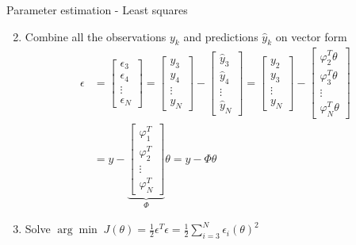 \documentclass[presentation,aspectratio=169]{beamer}
\begin{document}
\begin{frame}[label={sec:orgd1a0844}]{Parameter estimation - Least squares}
\begin{enumerate}
\setcounter{enumi}{1}
\item Combine all the observations \(y_k\) and predictions \(\hat{y}_k\) on vector form
\begin{align*}
\epsilon &= \begin{bmatrix} \epsilon_3\\\epsilon_4\\\vdots\\\epsilon_N\end{bmatrix} =  \begin{bmatrix} y_3\\ y_4\\\vdots\\y_N \end{bmatrix} - \begin{bmatrix} \hat{y}_3\\ \hat{y}_4\\\vdots\\\hat{y}_N \end{bmatrix}
 =  \begin{bmatrix} y_2\\ y_3\\\vdots\\y_N \end{bmatrix} - \begin{bmatrix} \varphi_2^T\theta\\ \varphi_3^T\theta\\\vdots\\\varphi_N^T\theta \end{bmatrix}\\
&= y - \underbrace{\begin{bmatrix}\varphi_1^T\\\varphi_2^T\\\vdots\\\varphi_N^T\end{bmatrix}}_{\Phi}\theta = y - \Phi\theta 
\end{align*}
\item Solve \(\arg\min \; J(\theta) = \frac{1}{2}\epsilon^T\epsilon = \frac{1}{2}\sum_{i=3}^N \epsilon_i(\theta)^2\)
\end{enumerate}
\end{frame}
\end{document}
